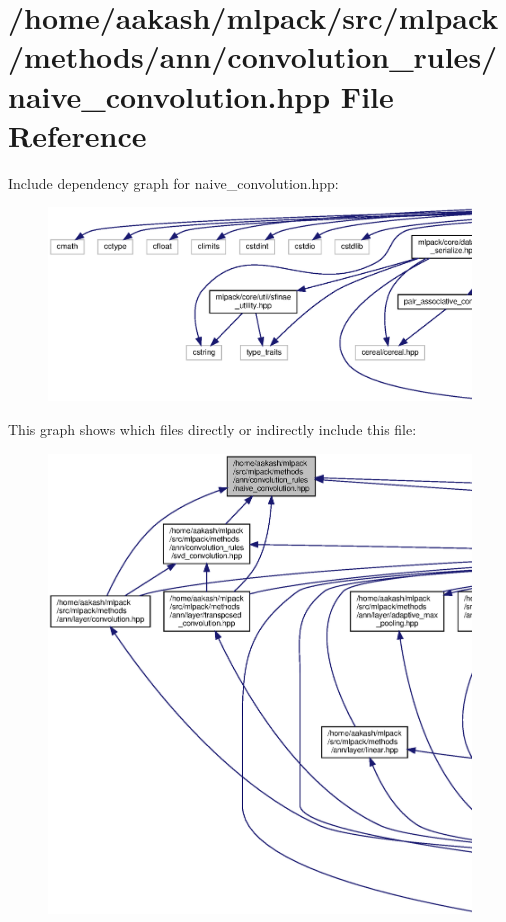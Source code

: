 \section{/home/aakash/mlpack/src/mlpack/methods/ann/convolution\+\_\+rules/naive\+\_\+convolution.hpp File Reference}
\label{naive__convolution_8hpp}
Include dependency graph for naive\+\_\+convolution.\+hpp\+:
\nopagebreak
\begin{figure}[H]
\begin{center}
\leavevmode
\includegraphics[width=350pt]{naive__convolution_8hpp__incl}
\end{center}
\end{figure}
This graph shows which files directly or indirectly include this file\+:
\nopagebreak
\begin{figure}[H]
\begin{center}
\leavevmode
\includegraphics[width=350pt]{naive__convolution_8hpp__dep__incl}
\end{center}
\end{figure}
